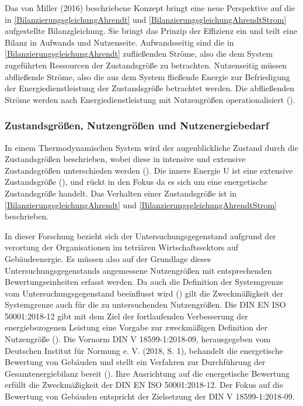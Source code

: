 Das von Miller (2016) beschriebene Konzept bringt eine neue Perspektive auf die in \eqref{BilanzierungsgleichungAhrendt} und \eqref{BilanzierungsgleichungAhrendtStrom} 
aufgestellte Bilanzgleichung. Sie bringt das Prinzip der Effizienz ein und teilt eine Bilanz in Aufwands und Nutzenseite. 
Aufwandsseitig sind die in \eqref{BilanzierungsgleichungAhrendt} zufließenden Ströme, also die dem System zugeführten Ressourcen der Zustandsgröße zu betrachten. 
Nutzenseitig müssen abfließende Ströme, also die aus dem System fließende Energie zur Befriedigung der Energiedienstleistung der Zustandsgröße betrachtet werden. 
Die abfließenden Ströme werden nach Energiedienstleistung mit Nutzengrößen operationalisiert (\cite{Miller.2016}).


\subsubsection{Zustandsgrößen, Nutzengrößen und Nutzenergiebedarf}
In einem Thermodynamischen System wird der augenblickliche Zustand durch die Zustandsgrößen beschrieben, wobei diese in intensive und extensive Zustandsgrößen 
unterschieden werden (\cite[S. 66]{Konstantin.2023}). Die innere Energie U ist eine extensive Zustandsgröße (\cite[S. 65]{Konstantin.2023}), und rückt in den 
Fokus da es sich um eine energetische Zustandsgröße handelt. Das Verhalten einer Zustandsgröße ist in \eqref{BilanzierungsgleichungAhrendt} und \eqref{BilanzierungsgleichungAhrendtStrom} 
beschrieben.

In dieser Forschung bezieht sich der Untersuchungsgegenstand aufgrund der verortung der Organisationen im tetriären Wirtschaftssektors auf Gebäudeenergie. 
Es müssen also auf der Grundlage dieses Untersuchungsgegenstands angemessene Nutzengrößen mit entsprechenden Bewertungseinheiten erfasst werden. 
Da auch die Definition der Systemgrenze vom Untersuchungsgegenstand beeinflusst wird (\cite[S. 109]{Miller.2016}) gilt die Zweckmäßigkeit der Systemgrenze 
auch für die zu untersuchenden Nutzengrößen.
Die DIN EN ISO 50001:2018-12 gibt mit dem Ziel der fortlaufenden Verbesserung der energiebezogenen Leistung eine Vorgabe zur zweckmäßigen Definition der Nutzengröße 
(\cite[S. 11]{DIN50001.2018}).
Die Vornorm DIN V 18599-1:2018-09, herausgegeben vom Deutschen Institut für Normung e. V. (2018, S. 1), behandelt die energetische Bewertung von Gebäuden und stellt ein 
Verfahren zur Durchführung der Gesamtenergiebilanz bereit (\cite[S. 9]{DIN18599.2018}). Ihre Ausrichtung auf die energetische Bewertung erfüllt die Zweckmäßigkeit der 
DIN EN ISO 50001:2018-12. Der Fokus auf die Bewertung von Gebäuden entspricht der Zielsetzung der DIN V 18599-1:2018-09. 

